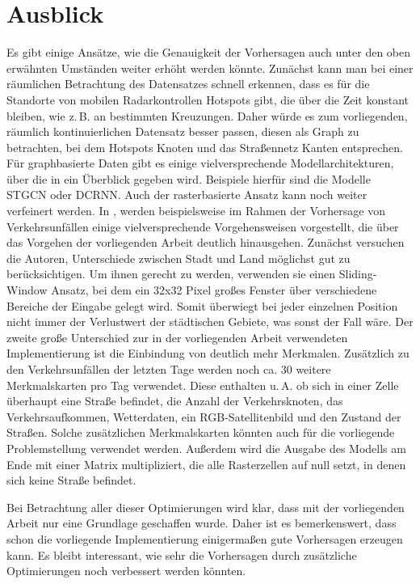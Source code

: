 \section{Ausblick}
\label{sec:Ausblick}
Es gibt einige Ansätze, wie die Genauigkeit der Vorhersagen auch unter den oben erwähnten Umständen weiter erhöht werden könnte.
Zunächst kann man bei einer räumlichen Betrachtung des Datensatzes schnell erkennen, dass es für die Standorte von mobilen Radarkontrollen Hotspots gibt, die über die Zeit konstant bleiben, wie z.\,B. an bestimmten Kreuzungen.
Daher würde es zum vorliegenden, räumlich kontinuierlichen Datensatz besser passen, diesen als Graph zu betrachten, bei dem Hotspots Knoten und das Straßennetz Kanten entsprechen.
Für graphbasierte Daten gibt es einige vielversprechende Modellarchitekturen, über die in \cite{DLTraff} ein Überblick gegeben wird.
Beispiele hierfür sind die Modelle STGCN oder DCRNN.
Auch der rasterbasierte Ansatz kann noch weiter verfeinert werden.
In \cite{HeteroConvLSTM}, werden beispielsweise im Rahmen der Vorhersage von Verkehrsunfällen einige vielversprechende Vorgehensweisen vorgestellt, die über das Vorgehen der vorliegenden Arbeit deutlich hinausgehen.
Zunächst versuchen die Autoren, Unterschiede zwischen Stadt und Land möglichst gut zu berücksichtigen.
Um ihnen gerecht zu werden, verwenden sie einen Sliding-Window Ansatz, bei dem ein 32x32 Pixel großes Fenster über verschiedene Bereiche der Eingabe gelegt wird.
Somit überwiegt bei jeder einzelnen Position nicht immer der Verlustwert der städtischen Gebiete, was sonst der Fall wäre.
Der zweite große Unterschied zur in der vorliegenden Arbeit verwendeten Implementierung ist die Einbindung von deutlich mehr Merkmalen.
Zusätzlich zu den Verkehrsunfällen der letzten Tage werden noch ca. 30 weitere Merkmalskarten pro Tag verwendet.
Diese enthalten u.\,A. ob sich in einer Zelle überhaupt eine Straße befindet, die Anzahl der Verkehrsknoten, das Verkehrsaufkommen, Wetterdaten, ein RGB-Satellitenbild und den Zustand der Straßen.
Solche zusätzlichen Merkmalskarten könnten auch für die vorliegende Problemstellung verwendet werden.
Außerdem wird die Ausgabe des Modells am Ende mit einer Matrix multipliziert, die alle Rasterzellen auf null setzt, in denen sich keine Straße befindet.

Bei Betrachtung aller dieser Optimierungen wird klar, dass mit der vorliegenden Arbeit nur eine Grundlage geschaffen wurde.
Daher ist es bemerkenswert, dass schon die vorliegende Implementierung einigermaßen gute Vorhersagen erzeugen kann.
Es bleibt interessant, wie sehr die Vorhersagen durch zusätzliche Optimierungen noch verbessert werden könnten.
